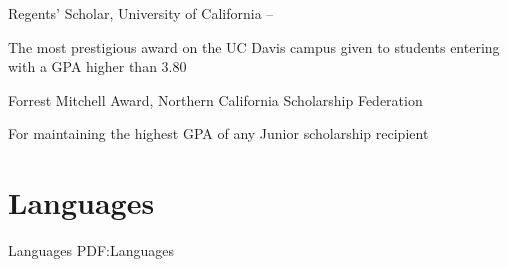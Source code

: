 \documentclass[letterpaper,MMMyyyy,nonstop]{simpleresumecv}
\begin{document}
\begin{body}
\Gap
\BulletItem
Regents' Scholar,
University of California
\hfill
{} --
\begin{detail}
\SubItem
The most prestigious award on the UC Davis campus given to students entering with a GPA higher than 3.80
\end{detail}

\Gap
\BulletItem
Forrest Mitchell Award,
Northern California Scholarship Federation
\hfill
{}
\begin{detail}
\SubItem
For maintaining the highest GPA of any Junior scholarship recipient
\end{detail}













\section
{Languages}
{Languages}
{PDF:Languages}


\end{body}
\end{document}
